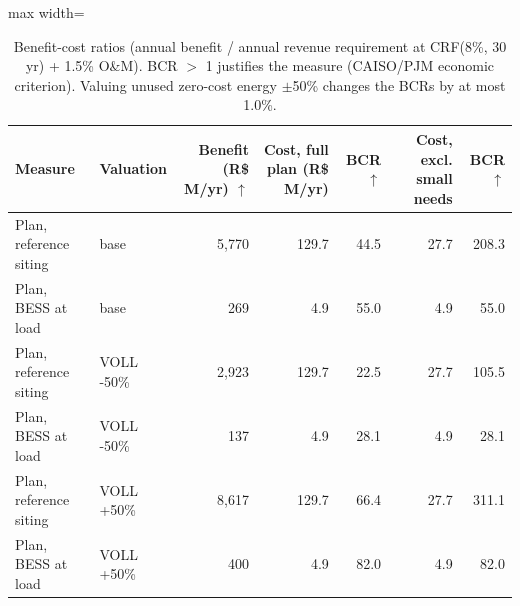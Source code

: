 \begin{table}[!htbp]
\centering
\footnotesize
\caption{Benefit-cost ratios (annual benefit / annual revenue requirement at CRF(8\%, 30 yr) + 1.5\% O\&M). BCR $>$ 1 justifies the measure (CAISO/PJM economic criterion). Valuing unused zero-cost energy $\pm$50\% changes the BCRs by at most 1.0\%.}
\label{tab:bcr}
\begin{adjustbox}{max width=\linewidth}
\begin{tabular}{llrrrrr}
\toprule
Measure & Valuation & Benefit (R\$ M/yr) $\uparrow$ & Cost, full plan (R\$ M/yr) & BCR $\uparrow$ & Cost, excl. small needs & BCR $\uparrow$ \\
\midrule
Plan, reference siting & base & 5,770 & 129.7 & 44.5 & 27.7 & 208.3 \\
Plan, BESS at load & base & 269 & 4.9 & 55.0 & 4.9 & 55.0 \\
Plan, reference siting & VOLL -50\% & 2,923 & 129.7 & 22.5 & 27.7 & 105.5 \\
Plan, BESS at load & VOLL -50\% & 137 & 4.9 & 28.1 & 4.9 & 28.1 \\
Plan, reference siting & VOLL +50\% & 8,617 & 129.7 & 66.4 & 27.7 & 311.1 \\
Plan, BESS at load & VOLL +50\% & 400 & 4.9 & 82.0 & 4.9 & 82.0 \\
\bottomrule
\end{tabular}
\end{adjustbox}
\end{table}
